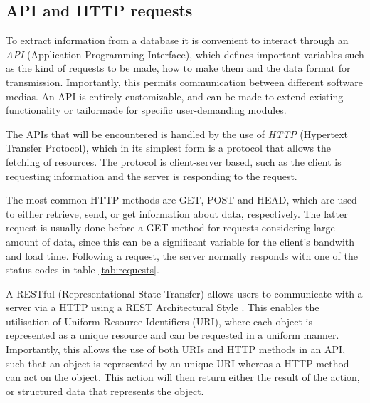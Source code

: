 \subsection{API and HTTP requests}

To extract information from a database it is convenient to interact through an \textit{API} (Application Programming Interface), which defines important variables such as the kind of requests to be made, how to make them and the data format for transmission. Importantly, this permits communication between different software medias. An API is entirely customizable, and can be made to extend existing functionality or tailormade for specific user-demanding modules.

The APIs that will be encountered is handled by the use of \textit{HTTP} (Hypertext Transfer Protocol), which in its simplest form is a protocol that allows the fetching of resources. The protocol is client-server based, such as the client is requesting information and the server is responding to the request.

The most common HTTP-methods are GET, POST and HEAD, which are used to either retrieve, send, or get information about data, respectively. The latter request is usually done before a GET-method for requests considering large amount of data, since this can be a significant variable for the client's bandwith and load time. Following a request, the server normally responds with one of the status codes in table \ref{tab:requests}.

\begin{table}[!ht]
\centering
\caption{Numeric status code for response. The leftmost digit decide the type of response, while the two follow-up digits depends on the implemented API.}
\label{tab:requests}
\noindent{}
\end{table}

A RESTful (Representational State Transfer) allows users to communicate with a server via a HTTP using a REST Architectural Style \cite{Battle2008}. This enables the utilisation of Uniform Resource Identifiers (URI), where each object is represented as a unique resource and can be requested in a uniform manner. Importantly, this allows the use of both URIs and HTTP methods in an API, such that an object is represented by an unique URI whereas a HTTP-method can act on the object. This action will then return either the result of the action, or structured data that represents the object.

